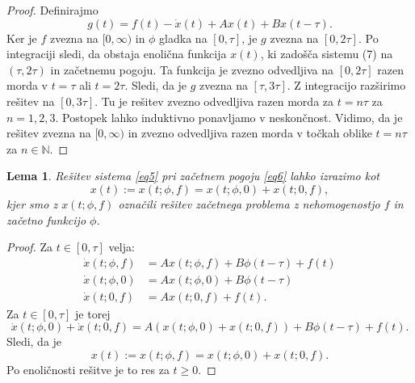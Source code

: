 \documentclass[12pt,a4paper]{amsart}
\theoremstyle{definition} %
\theoremstyle{plain} %
\newtheorem{lema}[definicija]{Lema}
\newcommand{\N}{\mathbb N}
\begin{document}
\begin{proof}
    Definirajmo
    \[g(t)=f(t)-\dot{x}(t)+Ax(t)+Bx(t-\tau).\]
    Ker je $f$ zvezna na $[0,\infty)$ in $\phi$ gladka na $[0,\tau]$, je $g$ zvezna na $[0,2\tau]$. Po integraciji 
    sledi, da obstaja enolična funkcija $x(t)$, ki zadošča sistemu (7) na $(\tau,2\tau)$ in začetnemu pogoju. Ta 
    funkcija je zvezno odvedljiva na $[0,2\tau]$ razen morda v $t=\tau$ ali $t=2\tau$.
    Sledi, da je $g$ zvezna na $[\tau,3\tau]$. Z integracijo razširimo rešitev 
    na $[0,3\tau]$. Tu je rešitev zvezno odvedljiva razen morda za $t=n\tau$ za $n=1,2,3$. Postopek lahko 
    induktivno ponavljamo v neskončnost. Vidimo, da je rešitev zvezna na $[0,\infty)$ in zvezno odvedljiva razen 
    morda v točkah oblike $t=n\tau$ za $n\in\N$.
\end{proof}

\begin{lema}
    Rešitev sistema \eqref{eq5} pri začetnem pogoju \eqref{eq6} lahko izrazimo kot
    \[x(t):=x(t;\phi,f)=x(t;\phi,0)+x(t;0,f),\]
    kjer smo z $x(t;\phi,f)$ označili rešitev začetnega problema z nehomogenostjo $f$ in začetno funkcijo $\phi$.
\end{lema}

\begin{proof}
    Za $t\in [0,\tau]$ velja:
    \begin{equation*}
        \begin{split}
            \dot{x}(t;\phi,f) &= Ax(t;\phi,f)+B\phi(t-\tau)+f(t) \\
            \dot{x}(t;\phi,0)  &= Ax(t;\phi,0)+B\phi(t-\tau)\\
            \dot{x}(t;0,f)  &= Ax(t;0,f)+f(t).
        \end{split}      
    \end{equation*}
Za $t\in[0,\tau]$ je torej
\[\dot{x}(t;\phi,0)+\dot{x}(t;0,f)=A\left(x(t;\phi,0)+x(t;0,f)\right)+B\phi(t-\tau)+f(t).\]
Sledi, da je
\[x(t):=x(t;\phi,f)=x(t;\phi,0)+x(t;0,f).\]
Po enoličnosti rešitve je to res za $t\geq0$.
\end{proof}
\end{document}
